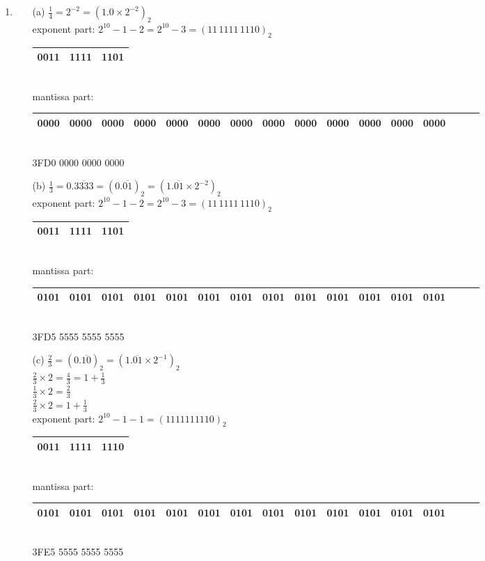 \documentclass[UTF8]{ctexart}
\begin{document}
\begin{enumerate}
\item \begin{itemize}
\item[(a)] $\frac{1}{4} = 2^{-2} = (1.0 \times 2^{-2})_2$ \\
exponent part: $2^{10} - 1 - 2 = 2^{10} - 3 = (11 \, 1111 \, 1110)_2$ \\
\begin{tabular}{|c|c|c|}
\hline
0011 & 1111 & 1101\\
\hline
\end{tabular} \\
mantissa part: \\
\begin{tabular}{|c|c|c|c|c|c|c|c|c|c|c|c|c|c|c|c|}
\hline
0000 & 0000 & 0000 & 0000 & 0000 & 0000 & 0000 & 0000 & 0000 & 0000 & 0000 & 0000 & 0000\\
\hline
\end{tabular} \\
3FD0 0000 0000 0000
\item[(b)] $\frac{1}{3} = 0.\overline{3333} = (0.\overline{01})_2 = (1.\overline{01} \times 2^{-2})_2$ \\
exponent part: $2^{10} - 1 - 2= 2^{10} - 3 = (11 \, 1111 \, 1110)_2$ \\
\begin{tabular}{|c|c|c|}
\hline
0011 & 1111 & 1101\\
\hline
\end{tabular} \\
mantissa part: \\
\begin{tabular}{|c|c|c|c|c|c|c|c|c|c|c|c|c|c|c|c|}
\hline
0101 & 0101 & 0101 & 0101 & 0101 & 0101 & 0101 & 0101 & 0101 & 0101 & 0101 & 0101 & 0101\\
\hline
\end{tabular} \\
3FD5 5555 5555 5555

\item[ (c) ] $\frac{2}{3} = (0.\overline{10})_2 = (1.\overline{01} \times 2^{-1})_2$ \\
$ \frac{2}{3} \times 2 = \frac{4}{3} = 1 + \frac{1}{3}$ \\
$ \frac{1}{3} \times 2 = \frac{2}{3} $ \\
$ \frac{2}{3} \times 2 = 1 + \frac{1}{3} $ \\
exponent part: $2^{10} - 1 - 1 = (11 1111 1110)_2$ \\
\begin{tabular}{|c|c|c|}
\hline
0011 & 1111 & 1110\\
\hline
\end{tabular} \\
mantissa part: \\
\begin{tabular}{|c|c|c|c|c|c|c|c|c|c|c|c|c|c|c|c|}
\hline
0101 & 0101 & 0101 & 0101 & 0101 & 0101 & 0101 & 0101 & 0101 & 0101 & 0101 & 0101 & 0101\\
\hline
\end{tabular} \\
3FE5 5555 5555 5555


\end{itemize}
\end{enumerate}
\end{document}
